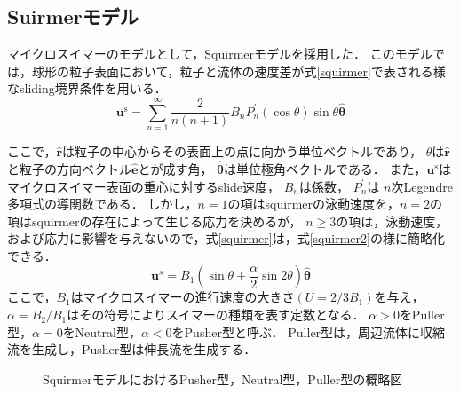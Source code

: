 \subsection{Suirmerモデル}
\par
マイクロスイマーのモデルとして，Squirmerモデル\cite{}を採用した．
このモデルでは，球形の粒子表面において，粒子と流体の速度差が式\eqref{squirmer}で表される様なsliding境界条件を用いる．
    \begin{equation}
        \boldsymbol{u}^\mathrm{s} = 
            \sum_{n=1}^\infty\frac{2}{n(n + 1)} B_n P_n^\prime(\cos{\theta}) \sin{\theta} \hat{\boldsymbol{\theta}}
        \label{squirmer}
    \end{equation}

\noindent
ここで，$\boldsymbol{\hat{r}}$は粒子の中心からその表面上の点に向かう単位ベクトルであり，
$\theta$は$\boldsymbol{\hat{r}}$と粒子の方向ベクトル$\boldsymbol{\hat{e}}$とが成す角，
$\boldsymbol{\hat{\theta}}$は単位極角ベクトルである．
また，$\boldsymbol{u}^\mathrm{s}$はマイクロスイマー表面の重心に対するslide速度，
$B_n$は係数，
$P^\prime_n$は $n$次Legendre多項式の導関数である．
しかし，$n=1$の項はsquirmerの泳動速度を，$n=2$の項はsquirmerの存在によって生じる応力を決めるが，
$n \geq 3$の項は，泳動速度，および応力に影響を与えないので，式\eqref{squirmer}は，式\eqref{squirmer2}の様に簡略化できる．
    \begin{equation}
            \boldsymbol{u}^s =
                B_1\left(\sin{\theta} + \frac{\alpha}{2}\sin{2\theta}\right)\hat{\boldsymbol{\theta}}
        \label{squirmer2}
    \end{equation}
ここで，$B_1$はマイクロスイマーの進行速度の大きさ$(U = 2/3 B_1)$を与え，$\alpha = B_2/B_1$はその符号によりスイマーの種類を表す定数となる．
$\alpha > 0$をPuller型，$\alpha = 0$をNeutral型，$\alpha < 0$をPusher型と呼ぶ．
Puller型は，周辺流体に収縮流を生成し，Pusher型は伸長流を生成する．
    \begin{figure}[htbp]
        \label{squirmer_flow}
        \caption{SquirmerモデルにおけるPusher型，Neutral型，Puller型の概略図}
    \end{figure}
